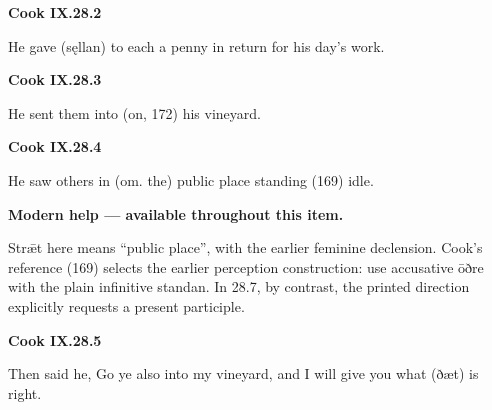 \par\begin{minipage}{\linewidth}\raggedright
\textbf{Cook IX.28.2}

He gave (sęllan) to each a penny in return for his day’s work.

\end{minipage}\par\addvspace{4pt}

\par\begin{minipage}{\linewidth}\raggedright
\textbf{Cook IX.28.3}

He sent them into (on, 172) his vineyard.

\end{minipage}\par\addvspace{4pt}

\par\begin{minipage}{\linewidth}\raggedright
\textbf{Cook IX.28.4}

He saw others in (om. the) public place standing (169) idle.

\textbf{Modern help — available throughout this item.}

\end{minipage}\par\addvspace{4pt}

Strǣt here means “public place”, with the earlier feminine declension. Cook’s reference (169) selects the earlier perception construction: use accusative ōðre with the plain infinitive standan. In 28.7, by contrast, the printed direction explicitly requests a present participle.

\par\begin{minipage}{\linewidth}\raggedright
\textbf{Cook IX.28.5}

Then said he, Go ye also into my vineyard, and I will give you what (ðæt) is right.

\end{minipage}\par\addvspace{4pt}

